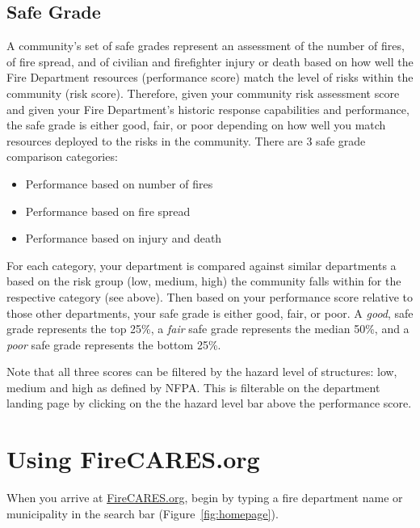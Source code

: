 \documentclass[12pt,oneside]{book}
\begin{document}
\FloatBarrier

\section{Safe Grade}

A community's set of safe grades represent an assessment of the number of fires, of fire spread, and of civilian and firefighter injury or death based on how well the Fire Department resources (performance score) match the level of risks within the community (risk score). Therefore, given your community risk assessment score and given your Fire Department's historic response capabilities and performance, the safe grade is either good, fair, or poor depending on how well you match resources deployed to the risks in the community. There are 3 safe grade comparison categories:

\begin{itemize}
\item Performance based on number of fires
\item Performance based on fire spread
\item Performance based on injury and death
\end{itemize}

For each category, your department is compared against similar departments a based on the risk group (low, medium, high) the community falls within for the respective category (see above). Then based on your performance score relative to those other departments, your safe grade is either good, fair, or poor. A {\it good}, safe grade represents the top 25\%, a {\it fair} safe grade represents the median 50\%, and a {\it poor} safe grade represents the bottom 25\%.

Note that all three scores can be filtered by the hazard level of structures: low, medium and high as defined by NFPA. This is filterable on the department landing page by clicking on the the hazard level bar above the performance score. 

\chapter{Using FireCARES.org}

When you arrive at \href{https://firecares.org}{FireCARES.org}, begin by typing a fire department name or municipality in the search bar (Figure~\ref{fig:homepage}). 
\end{document}

